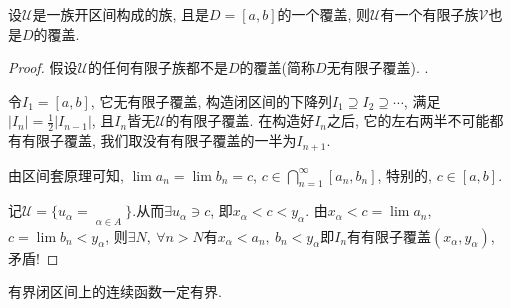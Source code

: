 \begin{theorem}
    设$\mathscr{U}$是一族开区间构成的族, 且是$D=[a,b]$的一个覆盖, 则$\mathscr{U}$有一个有限子族$\mathscr{V}$也是$D$的覆盖.
\end{theorem}
\begin{proof}
    假设$\mathscr{U}$的任何有限子族都不是$D$的覆盖(简称$D$无有限子覆盖). .
    
    令$I_1 = \left[ a,b \right] $, 它无有限子覆盖, 构造闭区间的下降列$I_1 \supseteq I_2 \supseteq \cdots $, 满足$\left| I_n \right| = \frac{1}{2} \left| I_{n-1} \right| $, 且$I_n$皆无$\mathscr{U}$的有限子覆盖. 在构造好$I_n$之后, 它的左右两半不可能都有有限子覆盖, 我们取没有有限子覆盖的一半为$I_{n+1}$.

    由区间套原理可知, $\lim a_n = \lim b_n = c$, $c \in \bigcap_{n=1} ^{\infty} \left[ a_n, b_n \right] $, 特别的, $c \in \left[ a,b \right] $. 
    
    记$\mathscr{U} = \{ u_{\alpha} = \mathop{\left( x_{\alpha}, y_{\alpha} \right) }\limits^{}_{\alpha \in A} \}$.从而$\exists u_{\alpha} \ni c$, 即$x_{\alpha} < c < y_{\alpha}$. 由$x_{\alpha} < c = \lim a_n$, $c = \lim b_n < y_{\alpha}$, 则$\exists N, \ \forall n > N$有$x_{\alpha} < a_n, \ b_n < y_{\alpha}$即$I_n$有有限子覆盖$\left( x_\alpha, y_\alpha \right) $, 矛盾!


\end{proof}

\begin{theorem}
    有界闭区间上的连续函数一定有界.
\end{theorem}